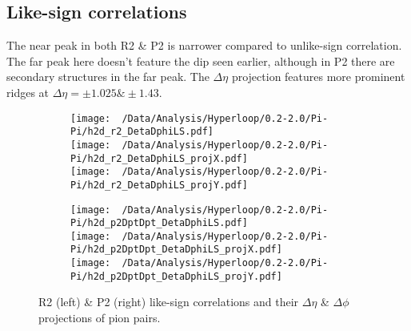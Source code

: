 \documentclass[12pt,a4paper,twoside]{report}
\begin{document}
\subsection{Like-sign correlations}
The near peak in both R2 \& P2 is narrower compared to unlike-sign correlation. The far peak here doesn't feature the dip seen earlier, although in P2 there are secondary structures in the far peak. The $\Delta\eta$ projection features more prominent ridges at $\Delta\eta=\pm1.025\&\pm1.43$.
\begin{figure}[H]
	\begin{subfigure}{0.49\linewidth}
		\texttt{[image: ~/Data/Analysis/Hyperloop/0.2-2.0/Pi-Pi/h2d\_r2\_DetaDphiLS.pdf]}\\
		\texttt{[image: ~/Data/Analysis/Hyperloop/0.2-2.0/Pi-Pi/h2d\_r2\_DetaDphiLS\_projX.pdf]}\\
		\texttt{[image: ~/Data/Analysis/Hyperloop/0.2-2.0/Pi-Pi/h2d\_r2\_DetaDphiLS\_projY.pdf]}\\
	\end{subfigure}
	\begin{subfigure}{0.49\linewidth}
		\texttt{[image: ~/Data/Analysis/Hyperloop/0.2-2.0/Pi-Pi/h2d\_p2DptDpt\_DetaDphiLS.pdf]}\\
		\texttt{[image: ~/Data/Analysis/Hyperloop/0.2-2.0/Pi-Pi/h2d\_p2DptDpt\_DetaDphiLS\_projX.pdf]}\\
		\texttt{[image: ~/Data/Analysis/Hyperloop/0.2-2.0/Pi-Pi/h2d\_p2DptDpt\_DetaDphiLS\_projY.pdf]}\\
	\end{subfigure}
	\caption{R2 (left) \& P2 (right) like-sign correlations and their $\Delta\eta$ \& $\Delta\phi$ projections of pion pairs.}
\end{figure}
\end{document}
